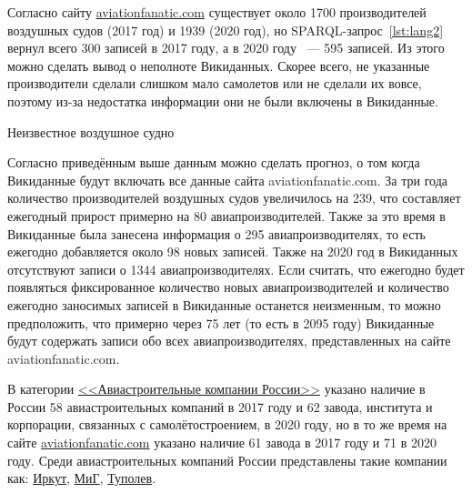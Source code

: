 Согласно сайту \href{https://www.aviationfanatic.com/}{aviationfanatic.com} существует около \num{1700} производителей воздушных судов\cite{count_of_aircraft_manufactures} (2017 год) и \num{1939} (2020 год), но SPARQL-запрос~\ref{lst:lang2} вернул всего 300 записей в 2017 году, а в 2020 году ~--- 595 записей. Из этого можно сделать вывод о неполноте Викиданных. Скорее всего, не указанные производители сделали слишком мало самолетов или не сделали их вовсе, поэтому из-за недостатка информации они не были включены в Викиданные. 

\label{aircraft_question_5}


\begin{marginfigure}[0.0cm]
{
\setlength{\fboxsep}{0pt}%
\setlength{\fboxrule}{1pt}%
%
}
  \caption{Неизвестное воздушное судно}%
  \label{fig:airship_question_aircraft}%
\end{marginfigure}


Согласно приведённым выше данным можно сделать прогноз, о том когда Викиданные будут включать все данные сайта aviationfanatic.com. За три года количество производителей воздушных судов увеличилось на 239, что составляет ежегодный прирост примерно на 80 авиапроизводителей. Также за это время в Викиданные была занесена информация о 295 авиапроизводителях, то есть ежегодно добавляется около 98 новых записей. Также на 2020 год в Викиданных отсутствуют записи о \num{1344} авиапроизводителях. Если считать, что ежегодно будет появляться фиксированное количество новых авиапроизводителей и количество ежегодно заносимых записей в Викиданные останется неизменным, то можно предположить, что примерно через 75 лет (то есть в 2095 году) Викиданные будут содержать записи обо всех авиапроизводителях, представленных на сайте aviationfanatic.com.


В категории \href{https://cutt.ly/NhrKnWn}{<<Авиастроительные компании России>>} указано наличие в России 58 авиастроительных компаний в 2017 году и 62 завода, института и корпорации, связанных с самолётостроением, в 2020 году, но в то же время на сайте \href{https://www.aviationfanatic.com/}{aviationfanatic.com} указано наличие 61 завода\cite{count_plants_of_aircrafts} в 2017 году и 71 в 2020 году. Среди авиастроительных компаний России представлены такие компании как: \href{https://clck.ru/RxFCs}{Иркут}, \href{https://clck.ru/QR6qZ}{МиГ}, \href{https://clck.ru/RxFG3}{Туполев}.

